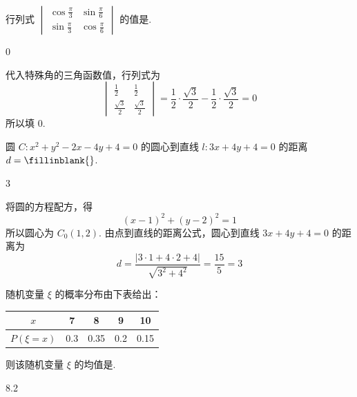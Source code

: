 \begin{problem}
行列式 \(\begin{vmatrix} \cos \frac{\pi}{3} & \sin \frac{\pi}{6} \\ \sin \frac{\pi}{3} & \cos \frac{\pi}{6} \end{vmatrix}\) 的值是\fillinblank{}.
\end{problem}

\begin{answer}
0
\end{answer}

\begin{solution}
代入特殊角的三角函数值，行列式为
\[
\begin{vmatrix}
\frac12&\frac12\\
\frac{\sqrt{3}}2&\frac{\sqrt{3}}2
\end{vmatrix}
=\frac12\cdot\frac{\sqrt{3}}2-\frac12\cdot\frac{\sqrt{3}}2=0
\]
所以填 \(0\).
\end{solution}

\begin{problem}
圆 \(C: x^{2} + y^{2} - 2x - 4y + 4 = 0\) 的圆心到直线 \(l: 3x + 4y + 4 = 0\) 的距离 \(d =\fillinblank{}\).
\end{problem}

\begin{answer}
3
\end{answer}

\begin{solution}
将圆的方程配方，得
\[
(x-1)^2+(y-2)^2=1
\]
所以圆心为 \(C_0(1,2)\). 由点到直线的距离公式，圆心到直线 \(3x+4y+4=0\) 的距离为
\[
d=\frac{|3\cdot1+4\cdot2+4|}{\sqrt{3^2+4^2}}=\frac{15}{5}=3
\]
\end{solution}

\begin{problem}
随机变量 \(\xi\) 的概率分布由下表给出：

\begin{center}
\begin{tabular}{c|cccc}
\(x\) & 7 & 8 & 9 & 10 \\
\hline
\(P(\xi = x)\) & 0.3 & 0.35 & 0.2 & 0.15
\end{tabular}
\end{center}

则该随机变量 \(\xi\) 的均值是\fillinblank{}.
\end{problem}

\begin{answer}
8.2
\end{answer}

